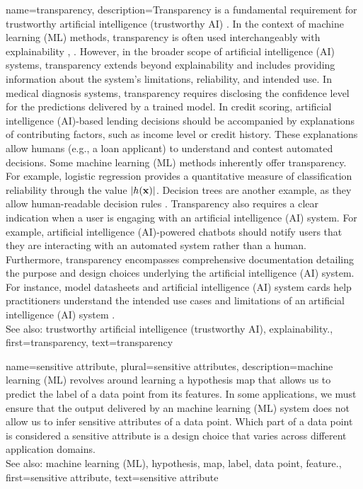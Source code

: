 {
{name={transparency},
	description={Transparency is a fundamental requirement for 
		trustworthy artificial intelligence (trustworthy AI) \cite{HLEGTrustworhtyAI}. In the context of machine learning (ML) 
		methods, transparency is often used interchangeably with explainability 
		\cite{JunXML2020}, \cite{gallese2023ai}. However, in the broader scope of artificial intelligence (AI) 
		systems, transparency extends beyond explainability and includes providing information 
		about the system’s limitations, reliability, and intended use. 
		In medical diagnosis systems, transparency requires disclosing the confidence level 
		for the predictions delivered by a trained model. In credit scoring, 
		artificial intelligence (AI)-based lending decisions should be accompanied by explanations of 
		contributing factors, such as income level or credit history. These explanations 
		allow humans (e.g., a loan applicant) to understand and contest automated decisions. 
		Some machine learning (ML) methods inherently offer transparency. For example, logistic regression 
		provides a quantitative measure of classification reliability through the value $|h({\bf x})|$. 
		Decision trees are another example, as they allow human-readable decision rules \cite{rudin2019stop}.
		Transparency also requires a clear indication when a user is engaging with an artificial intelligence (AI) system. 
		For example, artificial intelligence (AI)-powered chatbots should notify users that they are interacting with an 
		automated system rather than a human. Furthermore, transparency encompasses comprehensive 
		documentation detailing the purpose and design choices underlying the artificial intelligence (AI) system. 
		For instance, model datasheets \cite{DatasheetData2021} and artificial intelligence (AI) system cards \cite{10.1145/3287560.3287596} 
		help practitioners understand the intended use cases and limitations of an artificial intelligence (AI) system \cite{Shahriari2017}.
					\\ 
		See also: trustworthy artificial intelligence (trustworthy AI), explainability.},
	first={transparency}, 
	text={transparency} 
}



{name={sensitive attribute}, plural={sensitive attributes},
	description={machine learning (ML) revolves around learning a hypothesis map that allows 
		us to predict the label of a data point from its features. In some 
		applications, we must ensure that the output delivered by an machine learning (ML) system does 
		not allow us to infer sensitive attributes of a data point. Which part 
		of a data point is considered a sensitive attribute is a design 
		choice that varies across different application domains.
					\\ 
		See also: machine learning (ML), hypothesis, map, label, data point, feature.},
	first={sensitive attribute},
	text={sensitive attribute} 
}


}

